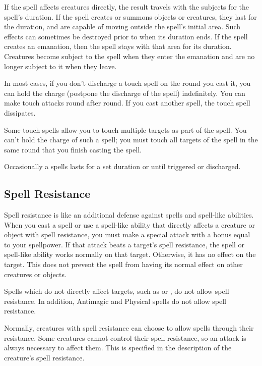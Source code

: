  If the spell affects creatures directly, the result travels with the subjects for the spell's duration. If the spell creates or summons objects or creatures, they last for the duration, and are capable of moving outside the spell's initial area. Such effects can sometimes be destroyed prior to when its duration ends. If the spell creates an emanation, then the spell stays with that area for its duration. Creatures become subject to the spell when they enter the emanation and are no longer subject to it when they leave.

 In most cases, if you don't discharge a touch spell on the round you cast it, you can hold the charge (postpone the discharge of the spell) indefinitely. You can make touch attacks round after round. If you cast another spell, the touch spell dissipates.

Some touch spells allow you to touch multiple targets as part of the spell. You can't hold the charge of such a spell; you must touch all targets of the spell in the same round that you finish casting the spell.

 Occasionally a spells lasts for a set duration or until triggered or discharged.

\subsection{Spell Resistance}\label{Spell Resistance}
Spell resistance is like an additional defense against spells and spell-like abilities. When you cast a spell or use a spell-like ability that directly affects a creature or object with spell resistance, you must make a special attack with a bonus equal to your spellpower. If that attack beats a target's spell resistance, the spell or spell-like ability works normally on that target. Otherwise, it has no effect on the target. This does not prevent the spell from having its normal effect on other creatures or objects.

Spells which do not directly affect targets, such as  or , do not allow spell resistance. In addition, Antimagic and Physical spells do not allow spell resistance.

Normally, creatures with spell resistance can choose to allow spells through their resistance. Some creatures cannot control their spell resistance, so an attack is always necessary to affect them. This is specified in the description of the creature's spell resistance.

